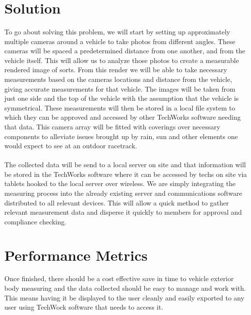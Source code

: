 \documentclass[a4paper, 10pt, onecolumn]{article}
\begin{document}
\section*{Solution}

\paragraph{} To go about solving this problem, we will start by setting up approximately multiple cameras around a vehicle to take photos from different angles. These cameras will be spaced a predetermined distance from one another, and from the vehicle itself. This will allow us to analyze those photos to create a measurable rendered image of sorts. From this render we will be able to take necessary measurements based on the cameras locations and distance from the vehicle, giving accurate measurements for that vehicle. The images will be taken from just one side and the top of the vehicle with the assumption that the vehicle is symmetrical. These measurements will then be stored in a local file system to which they can be approved and accessed by other TechWorks software needing that data. This camera array will be fitted with coverings over necessary components to alleviate issues brought up by rain, sun and other elements one would expect to see at an outdoor racetrack. 

\paragraph{}The collected data will be send to a local server on site and that information will be stored in the TechWorks software where it can be accessed by techs on site via tablets hooked to the local server over wireless. We are simply integrating the measuring process into the already existing server and communications software distributed to all relevant devices. This will allow a quick method to gather relevant measurement data and disperse it quickly to members for approval and compliance checking. 

\newpage

\section*{Performance Metrics}

\paragraph{} Once finished, there should be a cost effective save in time to vehicle exterior body measuring and the data collected should be easy to manage and work with. This means having it be displayed to the user cleanly and easily exported to any user using TechWock software that needs to access it. 
\end{document}
